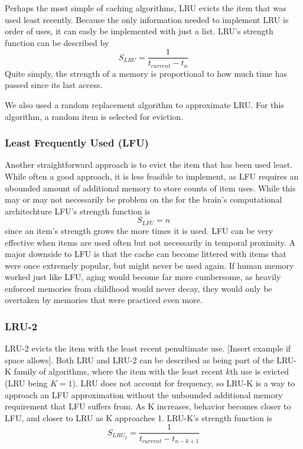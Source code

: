 \documentclass[10pt,letterpaper]{article}
\begin{document}
Perhaps the most simple of caching algorithms, LRU evicts the item that was used least
recently. Because the only information needed to implement LRU is order of uses,
it can easly be implemented with just a list. LRU's strength function can be described by
$$
S_{LRU} = \frac{1} {t_{current} - t_n}
$$
Quite simply, the strength of a memory is proportional to how much time has passed since its last
access. 

We also used a random replacement algorithm to approximate LRU. For this algorithm, 
a random item is selected for eviction.

\subsubsection{Least Frequently Used (LFU)}

Another straightforward approach is to evict the item that has been used least. While often a good approach,
it is less feasible to implement, as LFU requires an ubounded amount of additional memory to store counts
of item uses. While this may or may not necessarily be problem
on the for the brain's computational architechture LFU's strength function is
$$
S_{LFU} = n
$$
since an item's strength grows the more times it is used. LFU can be very effective when
items are used often but not necessarily in temporal proximity. A major downside
to LFU is that the cache can become littered with items that were once extremely popular, but
might never be used again. If human memory worked just like LFU, aging would become far more cumbersome, as
heavily enforced memories from childhood would never decay, they would
only be overtaken by memories that were practiced even more.

\subsubsection{LRU-2}

LRU-2 evicts the item with the least recent penultimate use. [Insert example if space allows]. Both LRU and
LRU-2 can be described as being part of the LRU-K family of algorithms, where
the item with the least recent $k$th use is evicted (LRU being $K=1$).
LRU does not account for frequency, so LRU-K is a way to approach an LFU approximation without the
unbounded additional memory requirement that LFU suffers from. As K increases, behavior becomes
closer to LFU, and closer to LRU as K approaches 1. LRU-K's strength function is
$$
S_{LRU_2} = \frac{1} {t_{current} - t_{n-k+1}}
$$
\end{document}
